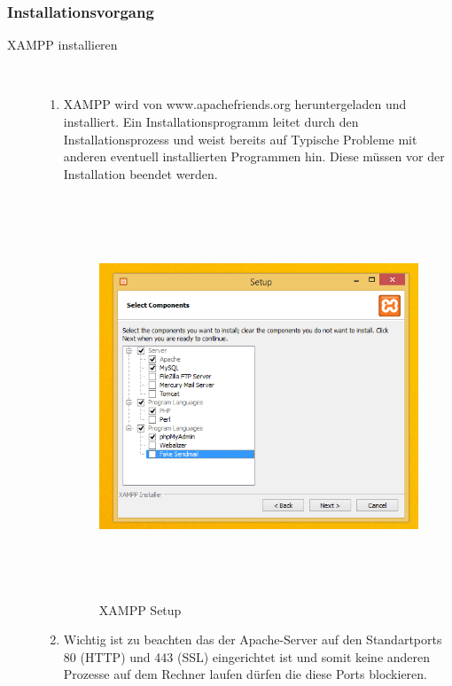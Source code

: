 \documentclass[a4paper, 12pt]{scrartcl}
\begin{document}
\subsubsection{Installationsvorgang}
\begin{description}
   \item[XAMPP installieren]~\par
   \begin{enumerate}
      \item XAMPP wird von www.apachefriends.org heruntergeladen und installiert. Ein Installationsprogramm leitet durch den Installationsprozess und weist bereits auf Typische Probleme mit anderen eventuell installierten Programmen hin. Diese müssen vor der Installation beendet werden.

\begin{figure}[H]
\centering
\includegraphics[height=12cm, width=15cm, keepaspectratio]{mem1.png}
\caption{XAMPP Setup}
\end{figure}    


      \item Wichtig ist zu beachten das der Apache-Server auf den Standartports 80 (HTTP) und 443 (SSL) eingerichtet ist und somit keine anderen Prozesse auf dem Rechner laufen dürfen die diese Ports blockieren.


\end{enumerate}
\end{description}
\end{document}
